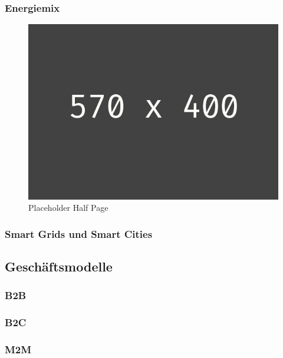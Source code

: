 \subsubsection{Energiemix}
\begin{figure}[h!]
	\centering
	\includegraphics[width=1.0\linewidth]{pictures/placeholder_half_page}
	\caption[Placeholder Half Page]{Placeholder Half Page}
	\label{fig:placeholder_half_page}
\end{figure}

\subsubsection{Smart Grids und Smart Cities}

\subsection{Geschäftsmodelle}

\subsubsection{B2B}

\subsubsection{B2C}

\subsubsection{M2M}

\newpage